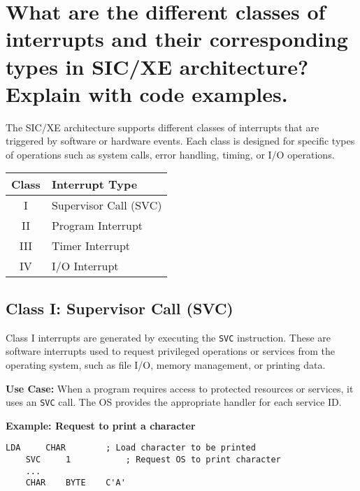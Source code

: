 \documentclass[12pt]{article}
\begin{document}
\newpage
\section{What are the different classes of interrupts and their corresponding types in SIC/XE architecture? Explain with code examples.}

The SIC/XE architecture supports different classes of interrupts that are triggered by software or hardware events. Each class is designed for specific types of operations such as system calls, error handling, timing, or I/O operations.

\begin{center}
    \begin{tabular}{|c|l|}
    \hline
    \textbf{Class} & \textbf{Interrupt Type} \\
    \hline
    I   & Supervisor Call (SVC) \\
    II  & Program Interrupt \\
    III & Timer Interrupt \\
    IV  & I/O Interrupt \\
    \hline
    \end{tabular}
    \end{center}
    
    \vspace{0.2cm}
    
    \subsection*{Class I: Supervisor Call (SVC)}
    
    Class I interrupts are generated by executing the \texttt{SVC} instruction. These are software interrupts used to request privileged operations or services from the operating system, such as file I/O, memory management, or printing data.
    
    \textbf{Use Case:} When a program requires access to protected resources or services, it uses an \texttt{SVC} call. The OS provides the appropriate handler for each service ID.
    
    \textbf{Example: Request to print a character}
    
    \begin{lstlisting}[language={[x86masm]Assembler}]
    LDA     CHAR        ; Load character to be printed
    SVC     1           ; Request OS to print character
    ...
    CHAR    BYTE    C'A'
    \end{lstlisting}
    
\end{document}
